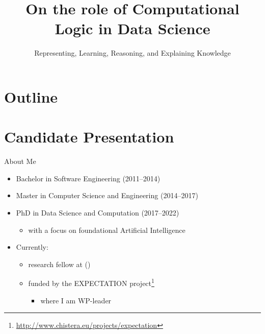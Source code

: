 \documentclass[presentation]{beamer}\mode<presentation>{\usetheme{AMSBolognaFC}}
\title[Role of CL in DS]{On the role of Computational Logic in Data Science}
\subtitle{Representing, Learning, Reasoning, and Explaining Knowledge}
\begin{document}

\frame{\titlepage}

\section*{Outline}
%
\frame[c]{\tableofcontents[hideallsubsections]}

\section{Candidate Presentation}

\begin{frame}{About Me}
    \begin{itemize}
        \item Bachelor in \alert{Software Engineering} (2011--2014)

        \vfill
        
        \item Master in \alert{Computer Science and Engineering} (2014--2017)

        \vfill
        
        \item PhD in \alert{Data Science and Computation} (2017--2022)
        \begin{itemize}
            \item with a focus on foundational \alert{Artificial Intelligence}
        \end{itemize}

        \vfill
        
        \item Currently:
        \begin{itemize}
            \item research fellow at \disiShort{} (\uniboShort{})
            \item funded by the \alert{EXPECTATION} project\footnote{\url{http://www.chistera.eu/projects/expectation}}
            \begin{itemize}
                \item where I am WP-leader
            \end{itemize}
        \end{itemize}
    \end{itemize}
\end{frame}
\end{document}

